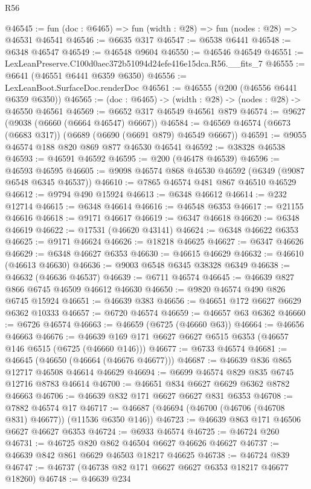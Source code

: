 \begin{lexlean}{R56}
\begin{coremodule}
@46545 := fun (doc : @6465) => fun (width : @28) => fun (nodes : @28) => @46531 @46541
@46546 := @6635 @317
@46547 := @6538 @6441
@46548 := @6348 @46547
@46549 := @46548 @9604
@46550 := @46546 @46549
@46551 := LexLeanPreserve.C100d0aec372b51094d24efe416e15dca.R56.__fits_7
@46555 := @6641 (@46551 @6441 @6359 @6350)
@46556 := LexLeanBoot.SurfaceDoc.renderDoc
@46561 := @46555 (@200 (@46556 @6441 @6359 @6350))
@46565 := (doc : @6465) -> (width : @28) -> (nodes : @28) -> @46550 @46561
@46569 := @6652 @317 @46549 @46561 @879
@46574 := @9627 (@9038 (@6660 (@6664 @46547) @6667))
@46584 := @46569 @46574 (@6673 (@6683 @317)) (@6689 (@6690 (@6691 @879) @46549 @6667))
@46591 := @9055 @46574 @188 @820 @869 @877 @46530 @46541
@46592 := @38328 @46538
@46593 := @46591 @46592
@46595 := @200 (@46478 @46539)
@46596 := @46593 @46595
@46605 := @9098 @46574 @868 @46530 @46592 (@6349 (@9087 @6548 @6345 @46537))
@46610 := @7865 @46574 @481 @867 @46510 @46529
@46612 := @9794 @490 @15924
@46613 := @6348 @46612
@46614 := @232 @12714
@46615 := @6348 @46614
@46616 := @46548 @6353
@46617 := @21155 @46616
@46618 := @9171 @46617
@46619 := @6347 @46618
@46620 := @6348 @46619
@46622 := @17531 (@46620 @43141)
@46624 := @6348 @46622 @6353
@46625 := @9171 @46624
@46626 := @18218 @46625
@46627 := @6347 @46626
@46629 := @6348 @46627 @6353
@46630 := @46615 @46629
@46632 := @46610 (@46613 @46630)
@46636 := @9003 @6548 @6345 @38328 @6349
@46638 := @46632 (@46636 @46537)
@46639 := @6711 @46574
@46645 := @46639 @827 @866 @6745 @46509 @46612 @46630
@46650 := @9820 @46574 @490 @826 @6745 @15924
@46651 := @46639 @383
@46656 := @46651 @172 @6627 @6629 @6362 @10333
@46657 := @6720 @46574
@46659 := @46657 @63 @6362
@46660 := @6726 @46574
@46663 := @46659 (@6725 (@46660 @63))
@46664 := @46656 @46663
@46676 := @46639 @169 @171 @6627 @6627 @6515 @6353 (@46657 @146 @6515 (@6725 (@46660 @146)))
@46677 := @6733 @46574
@46681 := @46645 (@46650 (@46664 (@46676 @46677)))
@46687 := @46639 @836 @865 @12717 @46508 @46614 @46629
@46694 := @6699 @46574 @829 @835 @6745 @12716 @8783 @46614
@46700 := @46651 @834 @6627 @6629 @6362 @8782 @46663
@46706 := @46639 @832 @171 @6627 @6627 @831 @6353
@46708 := @7882 @46574 @17
@46717 := @46687 (@46694 (@46700 (@46706 (@46708 @831) @46677)) (@11536 @6350 @146))
@46723 := @46639 @863 @171 @46506 @6627 @46627 @6353
@46724 := @6933 @46574
@46725 := @46724 @260
@46731 := @46725 @820 @862 @46504 @6627 @46626 @46627
@46737 := @46639 @842 @861 @6629 @46503 @18217 @46625
@46738 := @46724 @839
@46747 := @46737 (@46738 @82 @171 @6627 @6627 @6353 @18217 @46677 @18260)
@46748 := @46639 @234

\end{coremodule}
\end{lexlean}
